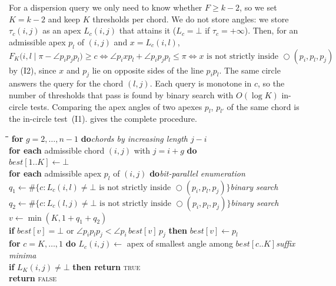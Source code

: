 \documentclass[11pt,a4paper]{article}
\theoremstyle{definition}
\theoremstyle{remark}
\newcommand{\ang}{\angle}
\newcommand{\circlethree}[3]{\bigcirc(#1,#2,#3)}
\newcommand{\nil}{\bot}
\newcommand{\AlgCapped}{\textsc{CappedDecision}}
\begin{document}
For a dispersion query we only need to know whether $F\ge k-2$, so we set
$K=k-2$ and keep $K$ thresholds per chord. We do not store angles: we store
$\tau_c(i,j)$ as an apex $L_c(i,j)$ that attains it ($L_c=\nil$ if
$\tau_c=+\infty$). Then, for an admissible apex $p_l$ of $(i,j)$ and
$x=L_c(i,l)$,
\[
F_K\bigl(i,l\mid\pi-\ang p_ip_jp_l\bigr)\ge c
\iff \ang p_ixp_l+\ang p_ip_jp_l\le\pi
\iff x\text{ is not strictly inside }\circlethree{p_i}{p_l}{p_j}
\]
by (I2), since $x$ and $p_j$ lie on opposite sides of the line $p_ip_l$. The
same circle answers the query for the chord $(l,j)$. Each query is monotone in
$c$, so the number of thresholds that pass is found by binary search with
$O(\log K)$ in-circle tests. Comparing the apex angles of two apexes $p_l$,
$p_{l'}$ of the same chord is the in-circle test~(I1). 
gives the complete procedure.

\begin{algorithm}
\caption{$\AlgCapped(P,k,r)$\quad ($k\ge3$, $K=k-2$)}\label{alg:capped}
\begin{tabbing}
\hspace{1.4em}\=\hspace{1.4em}\=\hspace{1.4em}\=\hspace{1.4em}\=\kill
\textbf{for} $g=2,\dots,n-1$ \textbf{do}\` \emph{chords by increasing length $j-i$}\\
\>\textbf{for each} admissible chord $(i,j)$ with $j=i+g$ \textbf{do}\\
\>\>$best[1..K]\gets\nil$\\
\>\>\textbf{for each} admissible apex $p_l$ of $(i,j)$ \textbf{do}\` \emph{bit-parallel enumeration}\\
\>\>\>$q_1\gets\#\{c: L_c(i,l)\ne\nil\text{ is not strictly inside }\circlethree{p_i}{p_l}{p_j}\}$\` \emph{binary search}\\
\>\>\>$q_2\gets\#\{c: L_c(l,j)\ne\nil\text{ is not strictly inside }\circlethree{p_i}{p_l}{p_j}\}$\` \emph{binary search}\\
\>\>\>$v\gets\min(K,1+q_1+q_2)$\\
\>\>\>\textbf{if} $best[v]=\nil$ or $\ang p_ip_lp_j<\ang p_i\,best[v]\,p_j$ \textbf{then} $best[v]\gets p_l$\\
\>\>\textbf{for} $c=K,\dots,1$ \textbf{do} $L_c(i,j)\gets$ apex of smallest angle among $best[c..K]$\` \emph{suffix minima}\\
\>\>\textbf{if} $L_K(i,j)\ne\nil$ \textbf{then return} \textsc{true}\\
\textbf{return} \textsc{false}
\end{tabbing}
\end{algorithm}
\end{document}
